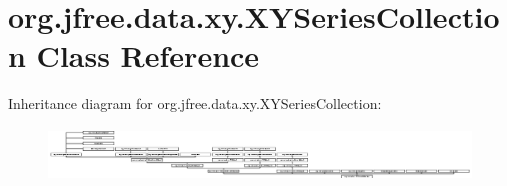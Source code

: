\hypertarget{classorg_1_1jfree_1_1data_1_1xy_1_1_x_y_series_collection}{}\section{org.\+jfree.\+data.\+xy.\+X\+Y\+Series\+Collection Class Reference}
\label{classorg_1_1jfree_1_1data_1_1xy_1_1_x_y_series_collection}
Inheritance diagram for org.\+jfree.\+data.\+xy.\+X\+Y\+Series\+Collection\+:\begin{figure}[H]
\begin{center}
\leavevmode
\includegraphics[height=1.420118cm]{classorg_1_1jfree_1_1data_1_1xy_1_1_x_y_series_collection}
\end{center}
\end{figure}
